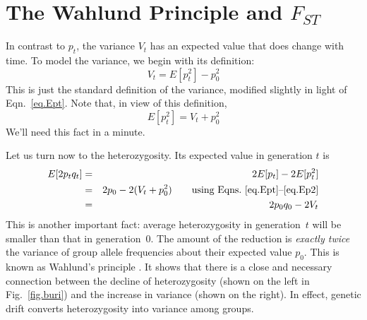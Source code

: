 \documentclass[twocolumn]{article}
\begin{document}
\section{The Wahlund Principle and $F_{ST}$}
In contrast to $p_t$, the variance $V_t$ has an expected value that
does change with time.  To model the variance, we begin with its
definition:
\[
V_t = E[p_t^2] - p_0^2
\]
This is just the standard definition of the variance, modified
slightly in light of Eqn.~\ref{eq.Ept}.  Note that, in view of
this definition,
\begin{equation}
E[p_t^2] = V_t + p_0^2
\label{eq.Ep2}
\end{equation}
We'll need this fact in a minute.

Let us turn now to the heterozygosity.  Its expected value in
generation $t$ is
\begin{eqnarray}
E[2p_t q_t] &=& 2E[p_t] - 2E[p_t^2]\nonumber\\
 &=& 2p_0 - 2(V_t + p_0^2)\qquad 
\hbox{using Eqns.~\ref{eq.Ept}--\ref{eq.Ep2}}\nonumber\\
 &=& 2p_0q_0 - 2V_t
\label{eq.wahlund}
\end{eqnarray}
This is another important fact: average heterozygosity in
generation~$t$ will be smaller than that in generation~0.  The amount
of the reduction is \emph{exactly twice} the variance of group allele
frequencies about their expected value $p_0$.  This is known as
Wahlund's principle \citep{Wahlund:75}.  It shows that there is a close
and necessary connection between the decline of heterozygosity (shown
on the left in Fig.~\ref{fig.buri}) and the increase in variance
(shown on the right).  In effect, genetic drift converts
heterozygosity into variance among groups.
\end{document}
